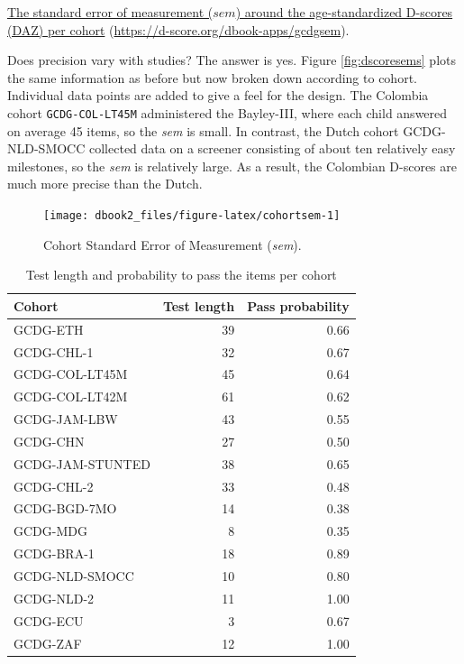 \documentclass[
]{book}
\begin{document}
\label{fig:dscoresems}\href{https://d-score.org/dbook-apps/gcdgsem/\#display=by_cohort\&nrow=1\&ncol=1\&arr=row\&pg=6\&labels=cohort\&sort=cohort;asc\&filter=\&sidebar=\&fv=}{The standard error of measurement (\(sem\)) around the age-standardized D-scores (DAZ) per cohort} (\url{https://d-score.org/dbook-apps/gcdgsem}).



Does precision vary with studies? The answer is yes. Figure \ref{fig:dscoresems} plots the same information as before but now broken down according to cohort. Individual data points are added to give a feel for the design. The Colombia cohort \texttt{GCDG-COL-LT45M} administered the Bayley-III, where each child answered on average 45 items, so the \emph{sem} is small. In contrast, the Dutch cohort GCDG-NLD-SMOCC collected data on a screener consisting of about ten relatively easy milestones, so the \emph{sem} is relatively large. As a result, the Colombian D-scores are much more precise than the Dutch.

\begin{figure}

{\centering \texttt{[image: dbook2\_files/figure-latex/cohortsem-1]} 

}

\caption{Cohort Standard Error of Measurement (\emph{sem}).}\label{fig:cohortsem}
\end{figure}



\begin{table}

\caption{\label{tab:npsem}Test length and probability to pass the items per cohort}
\centering
\begin{tabular}[t]{lrr}
\toprule
Cohort & Test length & Pass probability\\
\midrule
GCDG-ETH & 39 & 0.66\\
GCDG-CHL-1 & 32 & 0.67\\
GCDG-COL-LT45M & 45 & 0.64\\
GCDG-COL-LT42M & 61 & 0.62\\
GCDG-JAM-LBW & 43 & 0.55\\
\addlinespace
GCDG-CHN & 27 & 0.50\\
GCDG-JAM-STUNTED & 38 & 0.65\\
GCDG-CHL-2 & 33 & 0.48\\
GCDG-BGD-7MO & 14 & 0.38\\
GCDG-MDG & 8 & 0.35\\
\addlinespace
GCDG-BRA-1 & 18 & 0.89\\
GCDG-NLD-SMOCC & 10 & 0.80\\
GCDG-NLD-2 & 11 & 1.00\\
GCDG-ECU & 3 & 0.67\\
GCDG-ZAF & 12 & 1.00\\
\bottomrule
\end{tabular}
\end{table}
\end{document}
